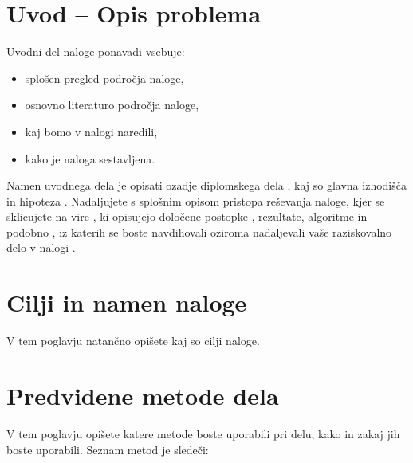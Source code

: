 \documentclass[pomnav,SMER=splošna]{fppdisp}
\begin{document}
\section{Uvod -- Opis problema}

Uvodni del naloge ponavadi vsebuje:

\begin{itemize}[nosep]
	\item splošen pregled področja naloge,
	\item osnovno literaturo področja naloge,
	\item kaj bomo v nalogi naredili,
	\item kako je naloga sestavljena.
\end{itemize}

Namen uvodnega dela je opisati ozadje diplomskega dela \cite{froude1888resistance}, kaj so glavna izhodišča in hipoteza \cite{kalisnik}. Nadaljujete s splošnim opisom pristopa reševanja naloge, kjer se sklicujete na vire \cite{web:lang:stats}, ki opisujejo določene postopke \cite{glob, kalisnik}, rezultate, algoritme in podobno \cite{wiki, zbornik, vec-avtorjev}, iz katerih se boste navdihovali oziroma nadaljevali vaše raziskovalno delo v nalogi \cite{lang}.


\section{Cilji in namen naloge}

V tem poglavju natančno opišete kaj so cilji naloge.


\section{Predvidene metode dela}

V tem poglavju opišete katere metode boste uporabili pri delu, kako in zakaj jih boste uporabili. Seznam metod je sledeči:
\end{document}
